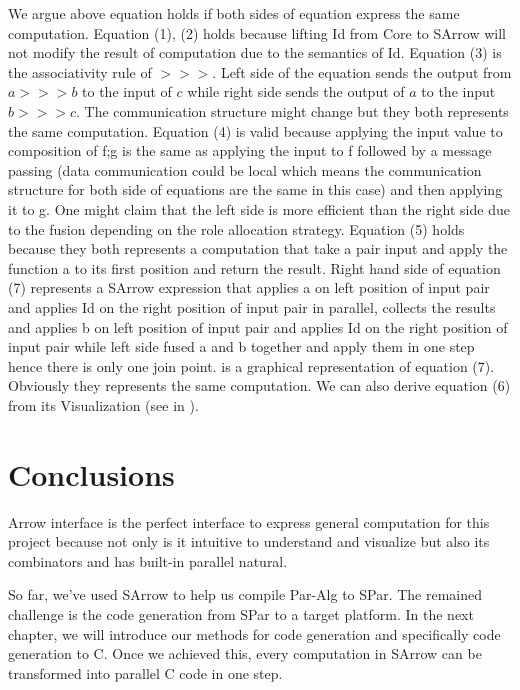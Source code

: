 We argue above equation holds if both sides of equation express the same computation. Equation (1), (2) holds because lifting Id from Core to SArrow will not modify the result of computation due to the semantics of Id. Equation (3) is the associativity rule of $>>>$. Left side of the equation sends the output from $a >>> b$ to the input of $c$ while right side sends the output of $a$ to the input $b >>> c$. The communication structure might change but they both represents the same computation. Equation (4) is valid because applying the input value to composition of f;g is the same as applying the input to f followed by a message passing (data communication could be local which means the communication structure for both side of equations are the same in this case) and then applying it to g. One might claim that the left side is more efficient than the right side due to the fusion depending on the role allocation strategy. Equation (5) holds because they both represents a computation that take a pair input and apply the function a to its first position and return the result. Right hand side of equation (7) represents a SArrow expression that applies a on left position of input pair and applies Id on the right position of input pair in parallel, collects the results and applies b on left position of input pair and applies Id on the right position of input pair while left side fused a and b together and apply them in one step hence there is only one join point.  is a graphical representation of equation (7). Obviously they represents the same computation. We can also derive equation (6) from its Visualization (see in ).

\section{Conclusions}
Arrow interface is the perfect interface to express general computation for this project because not only is it intuitive to understand and visualize but also its combinators \hask{***} and \hask{&&&} has built-in parallel natural.

So far, we've used SArrow to help us compile Par-Alg to SPar. The remained challenge is the code generation from SPar to a target platform. In the next chapter, we will introduce our methods for code generation and specifically code generation to C. Once we achieved this, every computation in SArrow can be transformed into parallel C code in one step.

